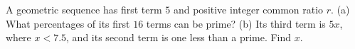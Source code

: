 A geometric sequence has first term $5$ and positive integer common ratio $r$. (a) What percentages of its first $16$ terms can be prime? (b) Its third term is $5x$, where $x<7.5$, and its second term is one less than a prime. Find $x$.
